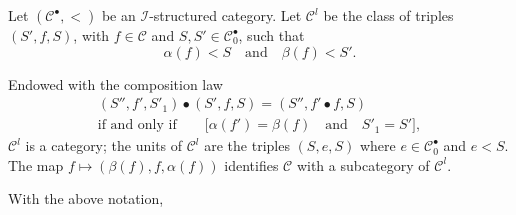 \documentclass[a4paper,fleqn]{article}
\theoremstyle{plain}
\newenvironment{proposition}[1]
  {\renewcommand\theinnerproposition{#1}\innerproposition}
  {\endinnerproposition}
\theoremstyle{definition}
\newcommand{\textand}{\quad\text{and}\quad}
\newcommand{\CC}{\mathcal{C}}
\newcommand{\II}{\mathcal{I}}
\begin{document}
Let $(\CC^\bullet,<)$ be an $\II$-structured category.
Let $\CC^l$ be the class of triples $(S',f,S)$, with $f\in\CC$ and $S,S'\in\CC_0^\bullet$, such that
\[
  \alpha(f)<S
  \textand
  \beta(f)<S'.
\]

Endowed with the composition law
\[
  \begin{gathered}
    (S'',f',S'_1)\bullet(S',f,S)
    = (S'',f'\bullet f,S)
  \\\text{if and only if}\qquad
    \big[\alpha(f')=\beta(f)\textand S'_1=S'\big],
  \end{gathered}
\]
$\CC^l$ is a category;
the units of $\CC^l$ are the triples $(S,e,S)$ where $e\in\CC_0^\bullet$ and $e<S$.
The map $f\mapsto(\beta(f),f,\alpha(f))$ identifies $\CC$ with a subcategory of $\CC^l$.

\begin{proposition}{26}
\label{proposition:ii-26}
  With the above notation,
\end{proposition}






\nocite{*}

\begingroup
\let\clearpage\relax
  \printbibliography[keyword={orig},heading=bibintoc,title=Bibliography]
  \printbibliography[keyword={oc},title={Citations to the collected works}]
  \printbibliography[keyword={comm},title={Citations from comments in the collected works}]
\endgroup
\end{document}
